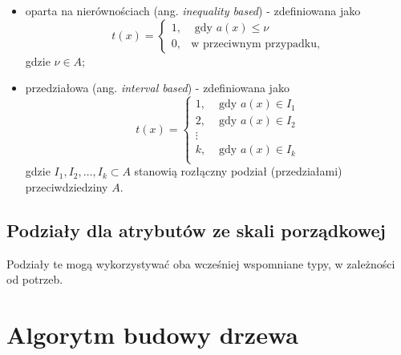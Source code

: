 \documentclass[
]{book}
\providecommand{\tightlist}{%
  \setlength{\itemsep}{0pt}\setlength{\parskip}{0pt}}
\theoremstyle{plain}
\theoremstyle{definition}
\theoremstyle{definition}
\theoremstyle{definition}
\theoremstyle{definition}
\theoremstyle{definition}
\theoremstyle{remark}
\begin{document}
\begin{itemize}
\tightlist
\item
  oparta na nierównościach (ang. \emph{inequality based}) - zdefiniowana jako
  \begin{equation}
  t(x) = \begin{cases}
    1, &\text{ gdy }a(x)\leq \nu\\
    0, & \text{w przeciwnym przypadku},
    \end{cases}
  \end{equation}
  gdzie \(\nu\in A\);
\item
  przedziałowa (ang. \emph{interval based}) - zdefiniowana jako
  \begin{equation}
    t(x) = \begin{cases}
        1, &\text{ gdy }a(x) \in I_1\\
        2, &\text{ gdy }a(x) \in I_2\\
        \vdots & \\
        k, &\text{ gdy }a(x) \in I_k\\
    \end{cases}
  \end{equation}
  gdzie \(I_1,I_2,\ldots,I_k\subset A\) stanowią rozłączny podział (przedziałami) przeciwdziedziny \(A\).
\end{itemize}

\subsection{Podziały dla atrybutów ze skali porządkowej}\label{podziaux142y-dla-atrybutuxf3w-ze-skali-porzux105dkowej}

Podziały te mogą wykorzystywać oba wcześniej wspomniane typy, w zależności od potrzeb.

\section{Algorytm budowy drzewa}\label{algorytm-budowy-drzewa}
\end{document}
